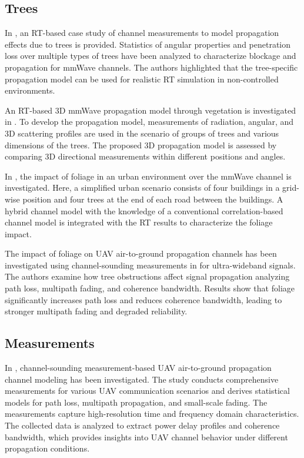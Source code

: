 \subsection{Trees}
In \cite{ray_tracing_foliage}, an RT-based case study of channel measurements to model propagation effects due to trees is provided. Statistics of angular properties and penetration loss over multiple types of trees have been analyzed to characterize blockage and propagation for mmWave channels. The authors highlighted that the tree-specific propagation model can be used for realistic RT simulation in non-controlled environments. 

An RT-based 3D mmWave propagation model through vegetation is investigated in \cite{ray_tracing_vegetation}. To develop the propagation model, measurements of radiation, angular, and 3D scattering profiles are used in the scenario of groups of trees and various dimensions of the trees. The proposed 3D propagation model is assessed by comparing 3D directional measurements within different positions and angles.  

In \cite{ray_tracing_tree_urban}, the impact of foliage in an urban environment over the mmWave channel is investigated. Here, a simplified urban scenario consists of four buildings in a grid-wise position and four trees at the end of each road between the buildings. A hybrid channel model with the knowledge of a conventional correlation-based channel model is integrated with the RT results to characterize the foliage impact.

The impact of foliage on UAV air-to-ground propagation channels has been investigated using channel-sounding measurements in \cite{wahab_paper} for ultra-wideband signals. The authors examine how tree obstructions affect signal propagation analyzing path loss, multipath fading, and coherence bandwidth. Results show that foliage significantly increases path loss and reduces coherence bandwidth, leading to stronger multipath fading and degraded reliability.

\subsection{Measurements}
In \cite{wahab_paper}, channel-sounding measurement-based UAV air-to-ground propagation channel modeling has been investigated. The study conducts comprehensive measurements for various UAV communication scenarios and derives statistical models for path loss, multipath propagation, and small-scale fading. The measurements capture high-resolution time and frequency domain characteristics. The collected data is analyzed to extract power delay profiles and coherence bandwidth, which provides insights into UAV channel behavior under different propagation conditions.


